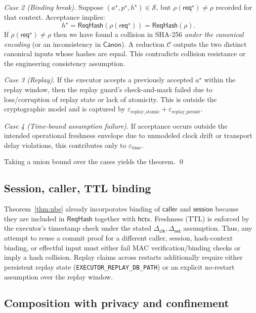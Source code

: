\emph{Case 2 (Binding break).} Suppose $(a^\star,p^\star,h^\star)\in\mathcal{S}$, but
$\rho(\mathsf{req}^\star)\neq \rho$ recorded for that context. Acceptance implies:
\[
h^\star = \mathsf{ReqHash}(\rho(\mathsf{req}^\star)) = \mathsf{ReqHash}(\rho).
\]
If $\rho(\mathsf{req}^\star)\neq \rho$ then we have found a collision in SHA-256 \emph{under the
canonical encoding} (or an inconsistency in $\mathsf{Canon}$). A reduction $\mathcal{C}$ outputs the
two distinct canonical inputs whose hashes are equal. This contradicts collision resistance or the
engineering consistency assumption.

\emph{Case 3 (Replay).} If the executor accepts a previously accepted $a^\star$ within the replay
window, then the replay guard's check-and-mark failed due to loss/corruption of replay state or lack
of atomicity. This is outside the cryptographic model and is captured by
$\varepsilon_{\mathrm{replay\_atomic}}+\varepsilon_{\mathrm{replay\_persist}}$.

\emph{Case 4 (Time-bound assumption failure).} If acceptance occurs outside the intended operational
freshness envelope due to unmodeled clock drift or transport delay violations, this contributes only
to $\varepsilon_{\mathrm{time}}$.

Taking a union bound over the cases yields the theorem.
\qed

\subsection{Session, caller, TTL binding}
\label{app:proofs:binding}

Theorem~\ref{thm:nbe} already incorporates binding of $\mathsf{caller}$ and $\mathsf{session}$ because
they are included in $\mathsf{ReqHash}$ together with $\mathsf{hctx}$.
Freshness (TTL) is enforced by the executor's timestamp check under the stated
$\Delta_{\mathsf{clk}},\Delta_{\mathsf{net}}$ assumption.
Thus, any attempt to reuse a commit proof for a different caller, session, hash-context binding, or
effectful input must either fail MAC verification/binding checks or imply a hash collision.
Replay claims across restarts additionally require either persistent replay state
(\texttt{EXECUTOR\_REPLAY\_DB\_PATH}) or an explicit no-restart assumption over the replay window.

\subsection{Composition with privacy and confinement}
\label{app:proofs:composition}

